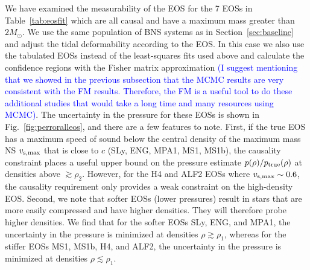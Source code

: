 \documentclass[twocolumn,prd,amssymb,aps,nofootinbib,showpacs,epsf]{revtex4}
\newcommand\les[2]{\textcolor{blue}{{#1}\sout{#2}}}
\begin{document}
We have examined the measurability of the EOS for the 7 EOSs in Table~\ref{tab:eosfit} which are all causal and have a maximum mass greater than $2M_\odot$. We use the same population of BNS systems as in Section~\ref{sec:baseline} and adjust the tidal deformability according to the EOS. In this case we also use the tabulated EOSs instead of the least-squares fits used above and calculate the confidence regions with the Fisher matrix approximation \les{(I suggest mentioning that we showed in the previous subsection that the MCMC results are very consistent with the FM results.  Therefore, the FM is a useful tool to do these additional studies that would take a long time and many resources using MCMC)}{}. The uncertainty in the pressure for these EOSs is shown in Fig.~\ref{fig:perroralleos}, and there are a few features to note. First, if the true EOS has a maximum speed of sound below the central density of the maximum mass NS $v_{\rm s, max}$ that is close to $c$ (SLy, ENG, MPA1, MS1, MS1b), the causality constraint places a useful upper bound on the pressure estimate $p(\rho)/p_{\rm true}(\rho)$ at densities above $\gtrsim \rho_2$. However, for the H4 and ALF2 EOSs where $v_{\rm s, max} \sim 0.6$, the causality requirement only provides a weak constraint on the high-density EOS. Second, we note that softer EOSs (lower pressures) result in stars that are more easily compressed and have higher densities. They will therefore probe higher densities. We find that for the softer EOSs SLy, ENG, and MPA1, the uncertainty in the pressure is minimized at densities $\rho \gtrsim \rho_1$, whereas for the stiffer EOSs MS1, MS1b, H4, and ALF2, the uncertainty in the pressure is minimized at densities $\rho \lesssim \rho_1$.
\end{document}
